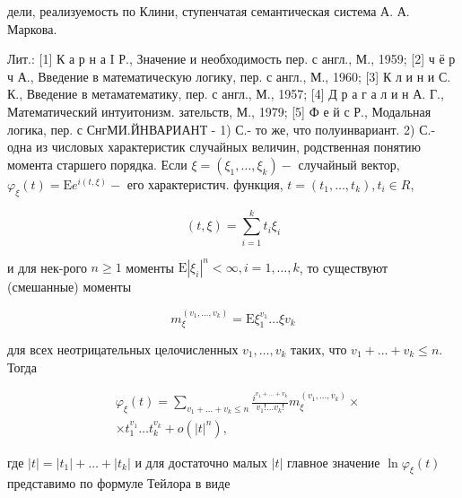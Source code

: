 \documentclass[10pt]{article}
\begin{document}
дели, реализуемость по Клини, ступенчатая семантическая система А. А. Маркова.



Лит.: [1] К а р н а I Р., Значение и необходимость пер. с англ., М., 1959; [2] ч ё р ч А., Введение в математическую логику, пер. с англ., М., 1960; [3] К л и н и С. К., Введение в метаматематику, пер. с англ., М., 1957; [4] Д р а г а л и н А. Г., Математический интуитонизм. зательств, М., 1979; [5] Ф е й с Р., Модальная логика, пер. с СнгМИ.ЙНВАРИАНТ - 1) С.- то же, что полуинвариант. 2) С.- одна из числовых характеристик случайных величин, родственная понятию момента старшего порядка. Если $\xi=\left(\xi_{1}, \ldots, \xi_{k}\right)-$ случайный вектор, $\varphi_{\xi}(t)=\mathrm{E} e^{i(t, \xi)}-$ его характеристич. функция, $t=\left(t_{1}, \ldots, t_{k}\right), t_{i} \in R$,



\[

(t, \xi)=\sum_{i=1}^{k} t_{i} \xi_{i}

\]



и для нек-рого $n \geqslant 1$ моменты $\mathrm{E}\left|\xi_{i}\right|^{n}<\infty, i=1, \ldots, k$, то существуют (смешанные) моменты



\[

m_{\xi}^{\left(v_{1}, \ldots, v_{k}\right)}=\mathrm{E} \xi_{1}^{v_{1}} \ldots \xi v_{k}

\]



для всех неотрицательных целочисленных $v_{1}, \ldots, v_{k}$ таких, что $v_{1}+\ldots+v_{k} \leqslant n$. Тогда



\[

\begin{aligned}

& \varphi_{\xi}(t)=\sum_{v_{1}+\ldots+v_{k} \leqslant n} \frac{i^{v_{1}+\ldots+v_{k}}}{v_{1} ! \ldots v_{k} !} m_{\xi}^{\left(v_{1}, \ldots, v_{k}\right)} \times \\

& \times t_{1}^{v_{1}} \ldots t_{k}^{v_{k}}+o\left(|t|^{n}\right),

\end{aligned}

\]



где $|t|=\left|t_{1}\right|+\ldots+\left|t_{k}\right|$ и для достаточно малых $|t|$ главное значение $\ln \varphi_{\xi}(t)$ представимо по формуле Тейлора в виде
\end{document}
